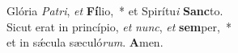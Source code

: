 Glória \textit{Pa}\textit{tri}, \textit{et} \textbf{Fí}lio,~* et Spirítu\textit{i} \textbf{Sanc}to.\\
Sicut erat in princípio, \textit{et} \textit{nunc}, \textit{et} \textbf{sem}per,~*\\
et in sǽcula sæculó\textit{rum}. \textbf{A}men.